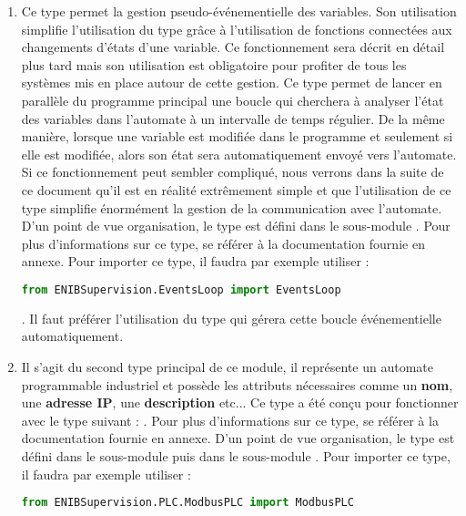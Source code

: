 {\begin{enumerate}
\item {} \newline
Ce type permet la gestion pseudo-événementielle des variables. Son utilisation simplifie l'utilisation du type  grâce à l'utilisation de fonctions connectées aux changements d'états d'une variable. Ce fonctionnement sera décrit en détail plus tard mais son utilisation est obligatoire pour profiter de tous les systèmes mis en place autour de cette gestion.\newline
Ce type permet de lancer en parallèle du programme principal une boucle qui cherchera à analyser l'état des variables dans l'automate à un intervalle de temps régulier. De la même manière, lorsque une variable est modifiée dans le programme et seulement si elle est modifiée, alors son état sera automatiquement envoyé vers l'automate. \newline
Si ce fonctionnement peut sembler compliqué, nous verrons dans la suite de ce document qu'il est en réalité extrêmement simple et que l'utilisation de ce type simplifie énormément la gestion de la communication avec l'automate. \newline
D'un point de vue organisation, le type  est défini dans le sous-module .\newline
Pour plus d'informations sur ce type, se référer à la documentation fournie en annexe.\newline
Pour importer ce type, il faudra par exemple utiliser :
\begin{lstlisting}[language=Python]
from ENIBSupervision.EventsLoop import EventsLoop
\end{lstlisting}

. Il faut préférer l'utilisation du type  qui gérera cette boucle événementielle automatiquement.

\item \label{tag-presentation-ModbusPLC}  \newline
Il s'agit du second type principal de ce module, il représente un automate programmable industriel et possède les attributs nécessaires comme un \textbf{nom}, une \textbf{adresse IP}, une \textbf{description} etc... Ce type a été conçu pour fonctionner avec le type suivant : .\newline
Pour plus d'informations sur ce type, se référer à la documentation fournie en annexe.\newline
D'un point de vue organisation, le type  est défini dans le sous-module  puis dans le sous-module . \newline
Pour importer ce type, il faudra par exemple utiliser :
\begin{lstlisting}[language=Python]
from ENIBSupervision.PLC.ModbusPLC import ModbusPLC
\end{lstlisting}


\end{enumerate}}
